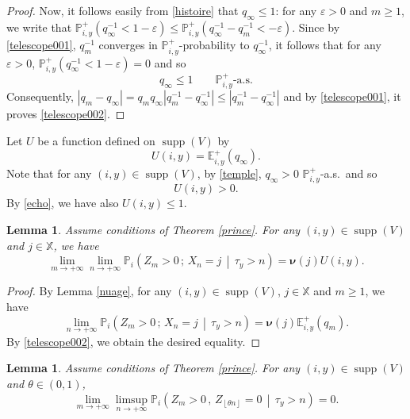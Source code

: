 \documentclass[12pt]{amsart}
\newtheorem{lemma}[theorem]{Lemma}
\theoremstyle{definition}
\numberwithin{equation}{section}
\newcommand*{\abs}[1]{\left\lvert#1\right\rvert}
\newcommand*{\pent}[1]{\left\lfloor#1\right\rfloor}
\newcommand*{\sachant}[2]{\left.#1 \,\middle|\,#2\right.}
\def\bb#1{\mathbb{#1}}
\def\bs#1{\boldsymbol{#1}}
\def\geq{\geqslant}
\def\leq{\leqslant}
\newcommand\ee{\varepsilon}
\DeclareMathOperator{\supp}{supp}
\begin{document}
\begin{proof}
Now, it follows easily from \eqref{histoire} that $q_{\infty} \leq 1$: for any $\ee > 0$ and $m \geq 1$, we write that $\bb P_{i,y}^+ \left( q_{\infty}^{-1} < 1-\ee \right) \leq \bb P_{i,y}^+ \left( q_{\infty}^{-1} - q_m^{-1} < -\ee \right)$. Since by \eqref{telescope001}, $q_{m}^{-1}$ converges in $\bb P_{i,y}^+$-probability to $q_{\infty}^{-1}$, it follows that for any $\ee > 0$, $\bb P_{i,y}^+ \left( q_{\infty}^{-1} < 1-\ee \right) = 0$ and so 
\begin{equation}
\label{echo}
q_{\infty} \leq 1 \qquad \bb P_{i,y}^+\text{-a.s.}
\end{equation}
Consequently, $\abs{q_m - q_{\infty}} = q_mq_{\infty}\abs{q_m^{-1} - q_{\infty}^{-1}} \leq \abs{q_m^{-1} - q_{\infty}^{-1}}$ and by \eqref{telescope001}, it proves \eqref{telescope002}.
\end{proof}

Let $U$ be a function defined on $\supp (V)$ by
\[
U(i,y) = \bb E_{i,y}^+ \left( q_{\infty} \right).
\]
Note that for any $(i,y) \in \supp(V)$, by \eqref{temple}, $q_{\infty} > 0$ $\bb P_{i,y}^+$-a.s.\ and so 
\begin{equation}
	\label{princesse}
	U(i,y) > 0.
\end{equation}
By \eqref{echo}, we have also $U(i,y) \leq 1$.

\begin{lemma}
Assume conditions of Theorem \ref{prince}.
\label{promesse}
For any $(i,y) \in \supp(V)$ and $j \in \bb X$, we have
\[
\lim_{m\to +\infty} \lim_{n\to +\infty} \bb P_i \left( \sachant{Z_m > 0 \,;\, X_n = j}{ \tau_y > n } \right) = \bs \nu(j) U(i,y).
\]
\end{lemma}

\begin{proof}
By Lemma \ref{nuage}, for any $(i,y) \in \supp(V)$, $j \in \bb X$ and $m \geq 1$, we have
\[
\lim_{n\to +\infty} \bb P_i \left( \sachant{Z_m > 0 \,;\, X_n = j}{ \tau_y > n } \right) = \bs \nu(j) \bb E_{i,y}^+ \left( q_m \right).
\]
By \eqref{telescope002}, we obtain the desired equality.
\end{proof}

\begin{lemma}
Assume conditions of Theorem \ref{prince}.
\label{prologue}
For any $(i,y) \in \supp (V)$ and $\theta \in (0,1)$,
\[
\lim_{m\to+\infty} \limsup_{n\to+\infty} \bb P_i \left( \sachant{Z_m > 0 \,,\, Z_{\pent{\theta n}} =0}{ \tau_y > n } \right) = 0.
\]
\end{lemma}
\end{document}
